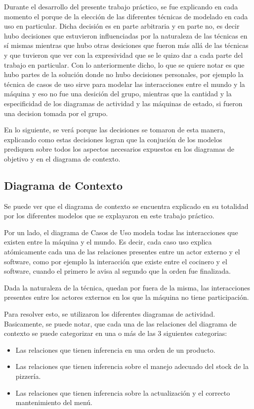 \documentclass[a4paper,10pt]{article}
\begin{document}
Durante el desarrollo del presente trabajo pr\'actico, se fue explicando en cada momento el porque de la elecci\'on de las diferentes
t\'ecnicas de modelado en cada uso en particular. Dicha decisi\'on es en parte arbitraria y en parte no, es decir hubo decisiones que estuvieron
influenciadas por la naturaleza de las t\'ecnicas en s\'i mismas mientras que hubo otras desiciones que fueron m\'as all\'a de las t\'ecnicas
y que tuvieron que ver con la expresividad que se le quizo dar a cada parte del trabajo en particular. Con lo anteriormente dicho, lo que se quiere notar
es que hubo partes de la soluci\'on donde no hubo decisiones personales, por ejemplo la t\'ecnica de casos de uso sirve para modelar las interacciones
entre el mundo y la m\'aquina y eso no fue una desici\'on del grupo, mientras que la cantidad y la especificidad de los diagramas de actividad
y las m\'aquinas de estado, si fueron una decision tomada por el grupo.

En lo siguiente, se ver\'a porque las decisiones se tomaron de esta manera, explicando como estas decisiones logran que la conjuci\'on
de los modelos prediquen sobre todos los aspectos necesarios expuestos en los diagramas de objetivo y en el diagrama de contexto.

\subsection*{Diagrama de Contexto}
Se puede ver que el diagrama de contexto se encuentra explicado en su totalidad por los diferentes modelos que se explayaron en este trabajo pr\'actico.

Por un lado, el diagrama de Casos de Uso modela todas las interacciones que existen entre la m\'aquina y el mundo. Es decir, cada caso uso explica
at\'omicamente cada una de las relaciones presentes entre un actor externo y el software, como por ejemplo la interacci\'on que existe entre
el cocinero y el software, cuando el primero le avisa al segundo que la orden fue finalizada. 

Dada la naturaleza de la t\'ecnica, quedan por fuera de la misma, las interacciones presentes entre los actores externos en los que la m\'aquina
no tiene participaci\'on. 

Para resolver esto, se utilizaron los diferentes diagramas de actividad. Basicamente, se puede notar, que cada una de las relaciones del diagrama de
contexto se puede categorizar en una o m\'as de las 3 siguientes categorias:
\begin{itemize}
\item Las relaciones que tienen inferencia en una orden de un producto.
\item Las relaciones que tienen inferencia sobre el manejo adecuado del stock de la pizzer\'ia.
\item Las relaciones que tienen inferencia sobre la actualizaci\'on y el correcto mantenimiento del men\'u.
\end{itemize}
\end{document}
